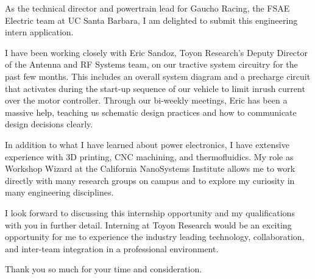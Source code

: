 \documentclass[11pt, letterpaper]{awesome-cv} %
\begin{document}
\makecvheader %

\makelettertitle %


\begin{cvletter}

As the technical director and powertrain lead for Gaucho Racing, the FSAE Electric team at UC Santa Barbara, I am delighted to submit this engineering intern application. 

I have been working closely with Eric Sandoz, Toyon Research's Deputy Director of the Antenna and RF Systems team, on our tractive system circuitry for the past few months. This includes an overall system diagram and a precharge circuit that activates during the start-up sequence of our vehicle to limit inrush current over the motor controller. Through our bi-weekly meetings, Eric has been a massive help, teaching us schematic design practices and how to communicate design decisions clearly.

In addition to what I have learned about power electronics, I have extensive experience with 3D printing, CNC machining, and thermofluidics. My role as Workshop Wizard at the California NanoSystems Institute allows me to work directly with many research groups on campus and to explore my curiosity in many engineering disciplines. 

I look forward to discussing this internship opportunity and my qualifications with you in further detail. Interning at Toyon Research would be an exciting opportunity for me to experience the industry leading technology, collaboration, and inter-team integration in a professional environment.

Thank you so much for your time and consideration.



\end{cvletter}


\makeletterclosing %
\end{document}
